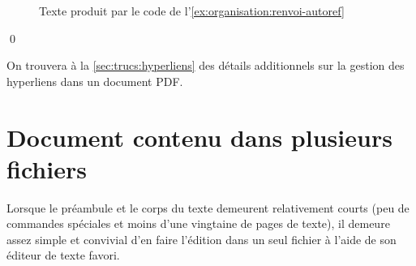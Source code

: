\begin{exemple}
  \begin{figure}
    \centering
    \caption{Texte produit par le code de
      l'\autoref{ex:organisation:renvoi-autoref}}
    \label{fig:organisation:renvoi-autoref}
  \end{figure}
  \qed
\end{exemple}

On trouvera à la \autoref{sec:trucs:hyperliens} des détails
additionnels sur la gestion des hyperliens dans un document PDF.


\section{Document contenu dans plusieurs fichiers}
\label{sec:organisation:include}

Lorsque le préambule et le corps du texte demeurent relativement
courts (peu de commandes spéciales et moins d'une vingtaine de pages
de texte), il demeure assez simple et convivial d'en faire l'édition
dans un seul fichier à l'aide de son éditeur de texte favori.

